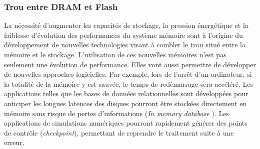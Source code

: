     \subsubsection{Trou entre DRAM et Flash}

        La nécessité d'augmenter les capacités de stockage, la pression énergétique et la faiblesse d'évolution des performances du système mémoire sont à l'origine du développement de nouvelles technologies visant à combler le trou situé entre la mémoire et le stockage. L'utilisation de ces nouvelles mémoires n'est pas seulement une évolution de performance. Elles vont aussi permettre de développer de nouvelles approches logicielles. Par exemple, lors de l'arrêt d'un ordinateur, si la totalité de la mémoire y est sauvée, le temps de redémarrage sera accéléré. Les applications telles que les bases de données relationnelles sont développées pour anticiper les longues latences des disques pourront être stockées directement en mémoire sans risque de pertes d'informations (\textit{In memory database} \cite{Oukid2015}). Les applications de simulations numériques pourront rapidement générer des points de contrôle (\textit{checkpoint}), permettant de reprendre le traitement suite à une erreur. 
        
        
        
